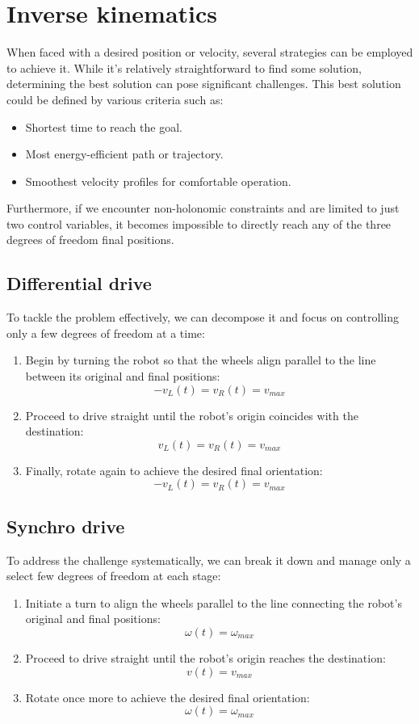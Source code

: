 \section{Inverse kinematics}

When faced with a desired position or velocity, several strategies can be employed to achieve it.
While it's relatively straightforward to find some solution, determining the best solution can pose significant challenges. 
This best solution could be defined by various criteria such as:
\begin{itemize}
    \item Shortest time to reach the goal.
    \item Most energy-efficient path or trajectory.
    \item Smoothest velocity profiles for comfortable operation.
\end{itemize}
Furthermore, if we encounter non-holonomic constraints and are limited to just two control variables, it becomes impossible to directly reach any of the three degrees of freedom final positions.

\subsection{Differential drive}
To tackle the problem effectively, we can decompose it and focus on controlling only a few degrees of freedom at a time:
\begin{enumerate}
    \item Begin by turning the robot so that the wheels align parallel to the line between its original and final positions:
    \[-v_L(t)=v_R(t)=v_{max}\]
    \item Proceed to drive straight until the robot's origin coincides with the destination:
    \[v_L(t)=v_R(t)=v_{max}\]
    \item Finally, rotate again to achieve the desired final orientation:
    \[-v_L(t)=v_R(t)=v_{max}\]
\end{enumerate}

\subsection{Synchro drive}
To address the challenge systematically, we can break it down and manage only a select few degrees of freedom at each stage:
\begin{enumerate}
    \item Initiate a turn to align the wheels parallel to the line connecting the robot's original and final positions:
    \[\omega(t)=\omega_{max}\]
    \item Proceed to drive straight until the robot's origin reaches the destination:
    \[v(t)=v_{max}\]
    \item Rotate once more to achieve the desired final orientation:
    \[\omega(t)=\omega_{max}\]
\end{enumerate}